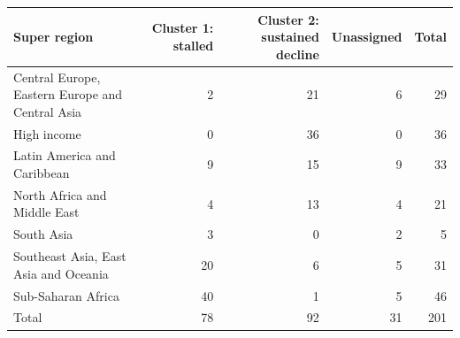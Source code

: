 \begin{tabular}{lrrrr}
\toprule
Super region & Cluster 1: stalled & Cluster 2: sustained decline & Unassigned & Total \\
\midrule
Central Europe, Eastern Europe and Central Asia &  2 & 21 &  6 &  29 \\
High income &  0 & 36 &  0 &  36 \\
Latin America and Caribbean &  9 & 15 &  9 &  33 \\
North Africa and Middle East &  4 & 13 &  4 &  21 \\
South Asia &  3 &  0 &  2 &   5 \\
Southeast Asia, East Asia and Oceania & 20 &  6 &  5 &  31 \\
Sub-Saharan Africa & 40 &  1 &  5 &  46 \\
Total & 78 & 92 & 31 & 201 \\
\bottomrule
\end{tabular}

